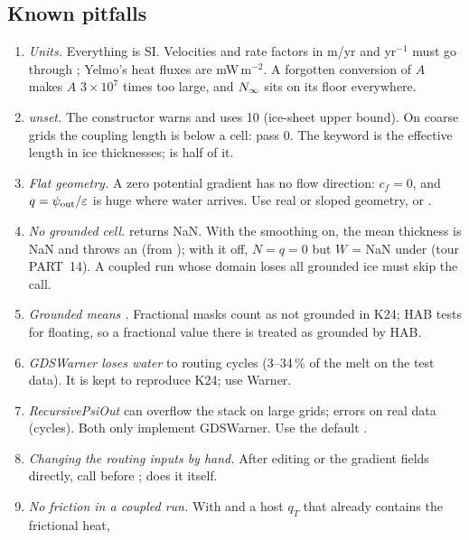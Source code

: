 \subsection{Known pitfalls}\label{sec:pitfalls}
\begin{enumerate}[leftmargin=1.5em]
\item \emph{Units.} Everything is SI. Velocities and rate factors in m/yr and yr$^{-1}$ must go through ; Yelmo's
  heat fluxes are mW\,m$^{-2}$. A forgotten conversion of $A$ makes $A$ $3\times10^7$ times too large, and ${N_\infty}$ sits on its
  floor everywhere.
\item \emph{ unset.} The constructor warns and uses 10 (ice-sheet upper bound). On coarse grids the
  coupling length is below a cell: pass 0. The keyword is the effective length in ice thicknesses;  is half of it.
\item \emph{Flat geometry.} A zero potential gradient has no flow direction: $c_f = 0$, and $q = {\psi_{\rm out}}/\varepsilon$ is huge where
  water arrives. Use real or sloped geometry, or .
\item \emph{No grounded cell.}  returns NaN. With the smoothing on, the mean thickness is NaN and
   throws an  (from ); with it off, $N = q = 0$ but $W$ = NaN under
   (tour PART~14). A coupled run whose domain loses all grounded ice must skip the call.
\item \emph{Grounded means .} Fractional masks count as not grounded in K24; HAB tests  for floating,
  so a fractional value there is treated as grounded by HAB.
\item \emph{GDSWarner loses water} to routing cycles (3--34\,\% of the melt on the test data). It is kept to reproduce K24; use Warner.
\item \emph{RecursivePsiOut} can overflow the stack on large grids;  errors on real data (cycles). Both
  only implement GDSWarner. Use the default .
\item \emph{Changing the routing inputs by hand.} After editing  or the gradient fields directly, call
   before ;  does it itself.
\item \emph{No friction in a coupled run.} With  and a host $q_T$ that already contains the frictional heat,

\end{enumerate}
